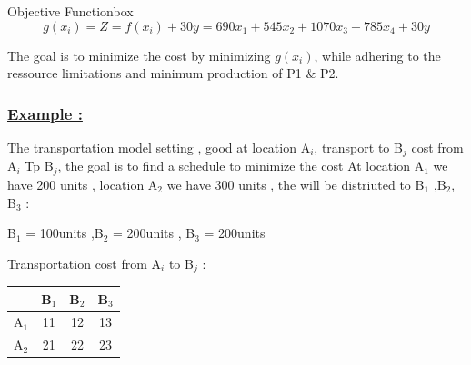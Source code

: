 \vspace{0.5cm}
\begin{prettyBox}{Objective Function}{box}
\[
g(x_i) = Z = f(x_i) + 30y =  690x_1 + 545x_2 + 1070x_3 + 785x_4 + 30y
\]
\begin{center}
The goal is to minimize the cost by minimizing \(g(x_i)\), while adhering to the ressource limitations and
minimum production of P1 \& P2.
\end{center}
\end{prettyBox}

\vspace{0.5cm}
\subsubsection*{\underline{Example :}}The transportation model setting , good at location A$_{i}$, transport 
to B$_{j}$ cost from A$_{i}$ Tp B$_{j}$, the goal is to find a schedule to minimize the cost 
At location A$_{1}$ we have 200 units , location A$_{2}$ we have 300 units , the will be distriuted to 
B$_{1}$ ,B$_{2}$, B$_{3}$ :

B$_{1}$ = 100units ,B$_{2}$ = 200units , B$_{3}$ = 200units

\vspace{0.2cm}
Transportation cost from A$_{i}$ to B$_{j}$ :

\begin{center}
    \begin{tabular}{|c|c|c|c|}
        \hline
        & B$_{1}$ & B$_{2}$ & B$_{3}$\\
        \hline 
        A$_{1}$ & 11 & 12 & 13 \\
        \hline 
        A$_{2}$ & 21 & 22 & 23\\
        \hline
    \end{tabular}
\end{center}

